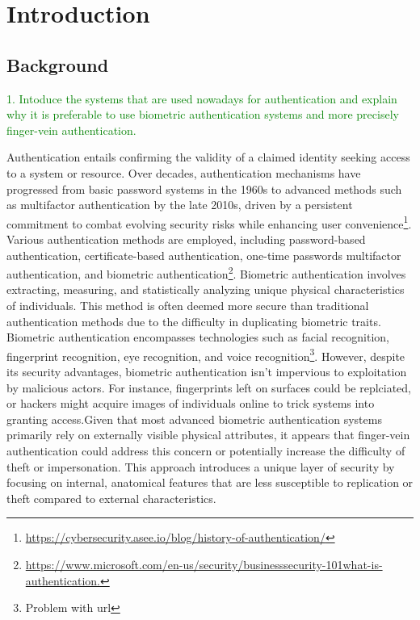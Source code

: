 \section{Introduction}

\subsection{Background}
\textcolor{green}
{1. Intoduce the systems that are used nowadays for authentication and explain why it is preferable to use biometric authentication systems and more precisely finger-vein authentication.}

Authentication entails confirming the validity of a claimed identity seeking access to a system or resource. Over decades, authentication mechanisms have progressed from basic password systems in the 1960s to advanced methods such as multifactor authentication by the late 2010s, driven by a persistent commitment to combat evolving security risks while enhancing user convenience\footnote{\url{https://cybersecurity.asee.io/blog/history-of-authentication/}}. Various authentication methods are employed, including password-based authentication, certificate-based authentication, one-time passwords multifactor authentication, and biometric authentication\footnote{\url{https://www.microsoft.com/en-us/security/businesssecurity-101what-is-authentication.}}. Biometric authentication involves extracting, measuring, and statistically analyzing unique physical characteristics of individuals. This method is often deemed more secure than traditional authentication methods due to the difficulty in duplicating biometric traits. Biometric authentication encompasses technologies such as facial recognition, fingerprint recognition, eye recognition, and voice recognition\footnote{Problem with url}. %
However, despite its security advantages, biometric authentication isn't impervious to exploitation by malicious actors. For instance, fingerprints left on surfaces could be replciated, or hackers might acquire images of individuals online to trick systems into granting access.\newline Given that most advanced biometric authentication systems primarily rely on externally visible physical attributes, it appears that finger-vein authentication could address this concern or potentially increase the difficulty of theft or impersonation. This approach introduces a unique layer of security by focusing on internal, anatomical features that are less susceptible 
to replication or theft compared to external characteristics.



